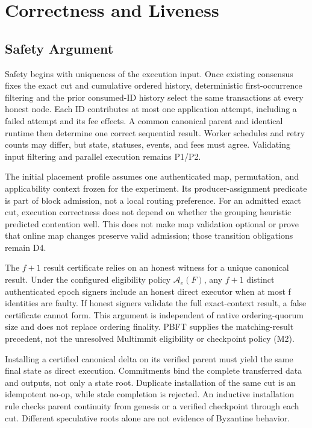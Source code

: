 \section{Correctness and Liveness}
\label{sec:correctness}

\subsection{Safety Argument}

Safety begins with uniqueness of the execution input. Once existing consensus fixes the exact cut and cumulative ordered history, deterministic first-occurrence filtering and the prior consumed-ID history select the same transactions at every honest node. Each ID contributes at most one application attempt, including a failed attempt and its fee effects. A common canonical parent and identical runtime then determine one correct sequential result. Worker schedules and retry counts may differ, but state, statuses, events, and fees must agree. Validating input filtering and parallel execution remains P1/P2.

The initial placement profile assumes one authenticated map, permutation, and applicability context frozen for the experiment. Its producer-assignment predicate is part of block admission, not a local routing preference. For an admitted exact cut, execution correctness does not depend on whether the grouping heuristic predicted contention well. This does not make map validation optional or prove that online map changes preserve valid admission; those transition obligations remain D4.

The \(f+1\) result certificate relies on an honest witness for a unique canonical result. Under the configured eligibility policy \(\mathcal A_e(F)\), any \(f+1\) distinct authenticated epoch signers include an honest direct executor when at most f identities are faulty. If honest signers validate the full exact-context result, a false certificate cannot form. This argument is independent of native ordering-quorum size and does not replace ordering finality. PBFT supplies the matching-result precedent, not the unresolved Multimmit eligibility or checkpoint policy (M2). \citep{pbft}

Installing a certified canonical delta on its verified parent must yield the same final state as direct execution. Commitments bind the complete transferred data and outputs, not only a state root. Duplicate installation of the same cut is an idempotent no-op, while stale completion is rejected. An inductive installation rule checks parent continuity from genesis or a verified checkpoint through each cut. Different speculative roots alone are not evidence of Byzantine behavior.

